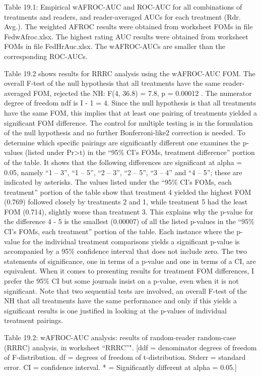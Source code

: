 \documentclass[
]{book}
\begin{document}
Table 19.1: Empirical wAFROC-AUC and ROC-AUC for all combinations of treatments and readers, and reader-averaged AUCs for each treatment (Rdr. Avg.). The weighted AFROC results were obtained from worksheet FOMs in file FedwAfroc.xlsx. The highest rating AUC results were obtained from worksheet FOMs in file FedHrAuc.xlsx. The wAFROC-AUCs are smaller than the corresponding ROC-AUCs.

Table 19.2 shows results for RRRC analysis using the wAFROC-AUC FOM. The overall F-test of the null hypothesis that all treatments have the same reader-averaged FOM, rejected the NH: F(4, 36.8) = 7.8, p = 0.00012 . The numerator degree of freedom ndf is I - 1 = 4. Since the null hypothesis is that all treatments have the same FOM, this implies that at least one pairing of treatments yielded a significant FOM difference. The control for multiple testing is in the formulation of the null hypothesis and no further Bonferroni-like2 correction is needed. To determine which specific pairings are significantly different one examines the p-values (listed under Pr\textgreater t) in the ``95\% CI's FOMs, treatment difference'' portion of the table. It shows that the following differences are significant at alpha = 0.05, namely ``1 -- 3'', ``1 -- 5'', ``2 -- 3'', ``2 -- 5'', ``3 -- 4'' and ``4 -- 5''; these are indicated by asterisks. The values listed under the ``95\% CI's FOMs, each treatment'' portion of the table show that treatment 4 yielded the highest FOM (0.769) followed closely by treatments 2 and 1, while treatment 5 had the least FOM (0.714), slightly worse than treatment 3. This explains why the p-value for the difference 4 - 5 is the smallest (0.00007) of all the listed p-values in the ``95\% CI's FOMs, each treatment'' portion of the table. Each instance where the p-value for the individual treatment comparisons yields a significant p-value is accompanied by a 95\% confidence interval that does not include zero. The two statements of significance, one in terms of a p-value and one in terms of a CI, are equivalent. When it comes to presenting results for treatment FOM differences, I prefer the 95\% CI but some journals insist on a p-value, even when it is not significant. Note that two sequential tests are involved, an overall F-test of the NH that all treatments have the same performance and only if this yields a significant results is one justified in looking at the p-values of individual treatment pairings.

Table 19.2: wAFROC-AUC analysis: results of random-reader random-case (RRRC) analysis, in worksheet ``RRRC''". {[}ddf = denominator degrees of freedom of F-distribution. df = degrees of freedom of t-distribution. Stderr = standard error. CI = confidence interval. * = Significantly different at alpha = 0.05.{]}
\end{document}
